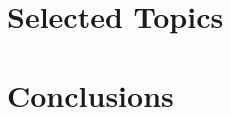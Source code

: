 \documentclass[12pt]{../include/ucthesis}
\begin{document}
















\chapter{Selected Topics}






\chapter{Conclusions}



% 
% 


\nocite{*}
% 

\singlespacing


\doublespacing
\end{document}
